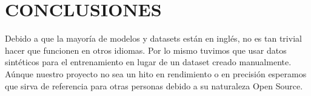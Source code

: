 \documentclass[../main.tex]{subfiles}
\begin{document}
\chapter{CONCLUSIONES}

Debido a que la mayoría de modelos y datasets están en inglés, no es tan trivial hacer que funcionen en otros idiomas.
Por lo mismo tuvimos que usar datos sintéticos para el entrenamiento en lugar de un dataset creado manualmente.
Aúnque nuestro proyecto no sea un hito en rendimiento o en precisión esperamos que sirva de referencia para otras personas debido a su naturaleza Open Source.

%
%
\end{document}
